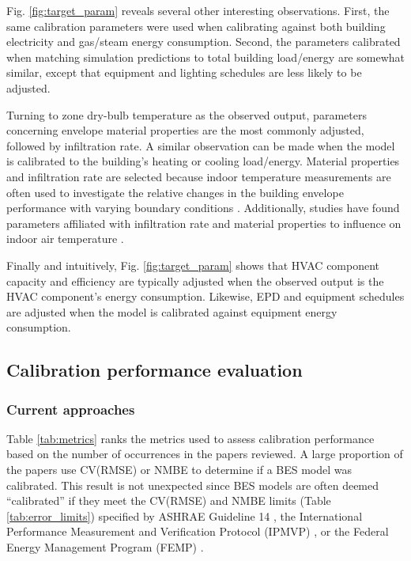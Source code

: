 \documentclass[review]{elsarticle}
\begin{document}
Fig. \ref{fig:target_param} reveals several other interesting observations. First, the same calibration parameters were used when calibrating against both building electricity and gas/steam energy consumption. Second, the parameters calibrated when matching simulation predictions to total building load/energy are somewhat similar, except that equipment and lighting schedules are less likely to be adjusted. 

Turning to zone dry-bulb temperature as the observed output, parameters concerning envelope material properties are the most commonly adjusted, followed by infiltration rate. A similar observation can be made when the model is calibrated to the building's heating or cooling load/energy. Material properties and infiltration rate are selected because indoor temperature measurements are often used to investigate the relative changes in the building envelope performance with varying boundary conditions \cite{lee2018improvements, figueiredo2018comparison, cacabelos2017development, enriquez2017towards}. Additionally, studies have found parameters affiliated with infiltration rate and material properties to influence on indoor air temperature \cite{martinez2019energy, enriquez2017towards, roberti2015calibrating, cipriano2015evaluation, ferrara2020optimizing}. 

Finally and intuitively, Fig. \ref{fig:target_param} shows that HVAC component capacity and efficiency are typically adjusted when the observed output is the HVAC component's energy consumption. Likewise, EPD and equipment schedules are adjusted when the model is calibrated against equipment energy consumption. 

\subsection{Calibration performance evaluation}

\subsubsection{Current approaches} \label{sec:performance_current}

Table \ref{tab:metrics} ranks the metrics used to assess calibration performance based on the number of occurrences in the papers reviewed. A large proportion of the papers use CV(RMSE) or NMBE to determine if a BES model was calibrated. This result is not unexpected since BES models are often deemed ``calibrated'' if they meet the CV(RMSE) and NMBE limits (Table \ref{tab:error_limits}) specified by ASHRAE Guideline 14 \cite{ashrae2014guideline}, the International Performance Measurement and Verification Protocol (IPMVP) \cite{evo2012international}, or the Federal Energy Management Program (FEMP) \cite{femp2015guidelines}.
\end{document}
